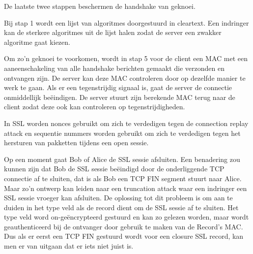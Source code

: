 \noindent De laatste twee stappen beschermen de handshake van geknoei.

\noindent Bij stap 1 wordt een lijst van algoritmes doorgestuurd in cleartext. Een indringer kan de sterkere algoritmes uit de lijst halen zodat de server een zwakker algoritme gaat kiezen. 

Om zo’n geknoei te voorkomen, wordt in stap 5 voor de client een MAC met een aaneenschakeling van alle handshake berichten gemaakt die verzonden en ontvangen zijn. De server kan deze MAC controleren door op dezelfde manier te werk te gaan. Als er een tegenstrijdig signaal is, gaat de server de connectie onmiddellijk beëindigen. De server stuurt zijn berekende MAC terug naar de client zodat deze ook kan controleren op tegenstrijdigheden.

\noindent In SSL worden nonces gebruikt om zich te verdedigen tegen de connection replay attack en sequentie nummers worden gebruikt om zich te verdedigen tegen het hersturen van pakketten tijdens een open sessie.


Op een moment gaat Bob of Alice de SSL sessie afsluiten. Een benadering zou kunnen zijn dat Bob de SSL sessie beëindigd door de onderliggende TCP connectie af te sluiten, dat is als Bob een TCP FIN segment stuurt naar Alice. Maar zo’n ontwerp kan leiden naar een truncation attack waar een indringer een SSL sessie vroeger kan afsluiten.
De oplossing tot dit probleem is om aan te duiden in het type veld als de record dient om de SSL sessie af te sluiten. Het type veld word on-geëncrypteerd gestuurd en kan zo gelezen worden, maar wordt geauthenticeerd bij de ontvanger door gebruik te maken van de Record’s MAC. Dus als er eerst een TCP FIN gestuurd wordt voor een closure SSL record, kan men er van uitgaan dat er iets niet juist is.
